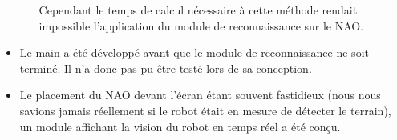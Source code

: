 \begin{itemize}
\begin{itemize}
              Cependant le temps de calcul nécessaire à cette méthode rendait impossible l’application du module de reconnaissance sur le NAO.
            \end{itemize}
      \item Le main a été développé avant que le module de reconnaissance ne soit terminé.
      Il n’a donc pas pu être testé lors de sa conception.
      \item Le placement du NAO devant l’écran étant souvent fastidieux (nous nous savions jamais réellement si le robot était en mesure de détecter le terrain),
      un module affichant la vision du robot en temps réel a été conçu.\\
    \end{itemize}
\pagebreak
